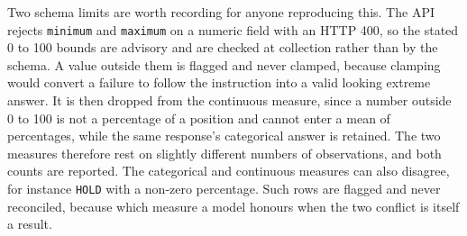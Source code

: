 \label{sec:schemalimits}\label{app:schemalimits}
Two schema limits are worth recording for anyone reproducing this. The API
rejects \texttt{minimum} and \texttt{maximum} on a numeric field with an
HTTP 400, so the stated 0 to 100 bounds are advisory and are checked at
collection rather than by the schema. A value outside them is flagged and
never clamped, because clamping would convert a failure to follow the
instruction into a valid looking extreme answer. It is then dropped from the
continuous measure, since a number outside 0 to 100 is not a percentage of a
position and cannot enter a mean of percentages, while the same response's
categorical answer is retained. The two measures therefore rest on slightly
different numbers of observations, and both counts are reported. The
categorical and continuous measures can also disagree, for instance
\texttt{HOLD} with a non-zero percentage. Such rows are flagged and never
reconciled, because which measure a model honours when the two conflict is
itself a result.
